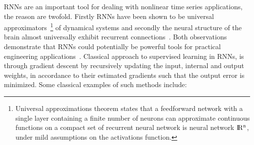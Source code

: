 \documentclass{WitsPhysicsReport}
\begin{document}
RNNs are an important tool for dealing with nonlinear time series applications, the reason are twofold. Firstly RNNs have been shown to be universal approximators~\footnote{Universal approximations theorem states that a feedforward network with a single layer containing a finite number of neurons can approximate continuous functions on a compact set of recurrent neural network is neural network ${\rm I\!R^{n}}$, under mild assumptions on the activations function. } of dynamical systems and secondly the neural structure of the brain almost universally exhibit recurrent connections~\cite{funahashi1993approximation}. Both observations demonstrate that RNNs could potentially be powerful tools for practical engineering applications~\cite{lukovsevivcius2009reservoir}. Classical approach to supervised learning in RNNs, is through gradient descent by recursively updating the input, internal and output weights, in accordance to their estimated gradients such that the output error is minimized. Some classical examples of such methods include:

\end{document}
